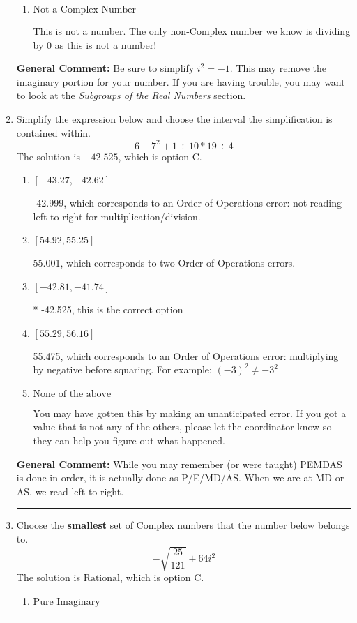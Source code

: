 \documentclass{extbook}[14pt]
\newcommand{\litem}[1]{\item #1

\rule{\textwidth}{0.4pt}}
\begin{document}
\begin{enumerate}
{\begin{enumerate}[label=\Alph*.]
These cannot be written as a fraction of Integers. Remember: $\pi$ is not an Integer!
\item \( \text{Not a Complex Number} \)

This is not a number. The only non-Complex number we know is dividing by 0 as this is not a number!
\end{enumerate}

\textbf{General Comment:} Be sure to simplify $i^2 = -1$. This may remove the imaginary portion for your number. If you are having trouble, you may want to look at the \textit{Subgroups of the Real Numbers} section.
}
\litem{
Simplify the expression below and choose the interval the simplification is contained within.
\[ 6 - 7^2 + 1 \div 10 * 19 \div 4 \]The solution is \( -42.525 \), which is option C.\begin{enumerate}[label=\Alph*.]
\item \( [-43.27, -42.62] \)

 -42.999, which corresponds to an Order of Operations error: not reading left-to-right for multiplication/division.
\item \( [54.92, 55.25] \)

 55.001, which corresponds to two Order of Operations errors.
\item \( [-42.81, -41.74] \)

* -42.525, this is the correct option
\item \( [55.29, 56.16] \)

 55.475, which corresponds to an Order of Operations error: multiplying by negative before squaring. For example: $(-3)^2 \neq -3^2$
\item \( \text{None of the above} \)

 You may have gotten this by making an unanticipated error. If you got a value that is not any of the others, please let the coordinator know so they can help you figure out what happened.
\end{enumerate}

\textbf{General Comment:} While you may remember (or were taught) PEMDAS is done in order, it is actually done as P/E/MD/AS. When we are at MD or AS, we read left to right.
}
\litem{
Choose the \textbf{smallest} set of Complex numbers that the number below belongs to.
\[ -\sqrt{\frac{25}{121}} + 64i^2 \]The solution is \( \text{Rational} \), which is option C.\begin{enumerate}[label=\Alph*.]
\item \( \text{Pure Imaginary} \)


\end{enumerate}}
\end{enumerate}
\end{document}
